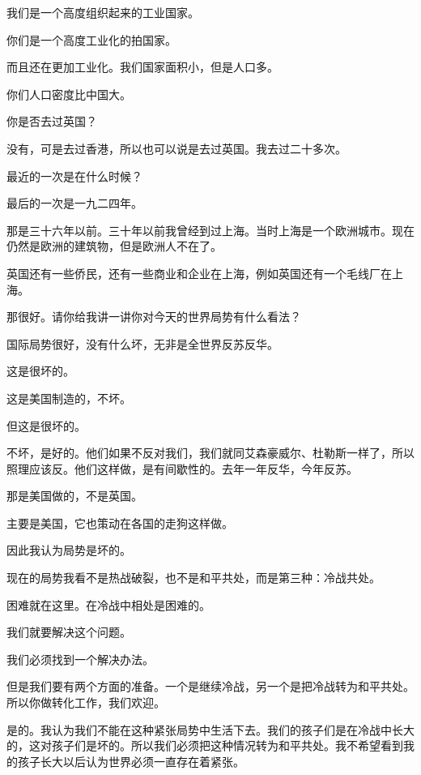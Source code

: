 我们是一个高度组织起来的工业国家。

你们是一个高度工业化的拍国家。

而且还在更加工业化。我们国家面积小，但是人口多。

你们人口密度比中国大。

你是否去过英国？

没有，可是去过香港，所以也可以说是去过英国。我去过二十多次。

最近的一次是在什么时候？

最后的一次是一九二四年。

那是三十六年以前。三十年以前我曾经到过上海。当时上海是一个欧洲城市。现在仍然是欧洲的建筑物，但是欧洲人不在了。

英国还有一些侨民，还有一些商业和企业在上海，例如英国还有一个毛线厂在上海。

那很好。请你给我讲一讲你对今天的世界局势有什么看法？

国际局势很好，没有什么坏，无非是全世界反苏反华。

这是很坏的。

这是美国制造的，不坏。

但这是很坏的。

不坏，是好的。他们如果不反对我们，我们就同艾森豪威尔、杜勒斯一样了，所以照理应该反。他们这样做，是有间歇性的。去年一年反华，今年反苏。

那是美国做的，不是英国。

主要是美国，它也策动在各国的走狗这样做。

因此我认为局势是坏的。

现在的局势我看不是热战破裂，也不是和平共处，而是第三种：冷战共处。

困难就在这里。在冷战中相处是困难的。

我们就要解决这个问题。

我们必须找到一个解决办法。

但是我们要有两个方面的准备。一个是继续冷战，另一个是把冷战转为和平共处。所以你做转化工作，我们欢迎。

是的。我认为我们不能在这种紧张局势中生活下去。我们的孩子们是在冷战中长大的，这对孩子们是坏的。所以我们必须把这种情况转为和平共处。我不希望看到我的孩子长大以后认为世界必须一直存在着紧张。

